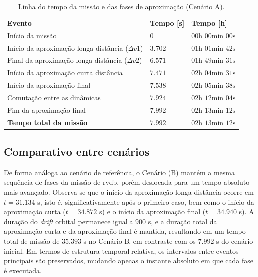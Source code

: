 \begin{table}[H]
\centering
\caption{Linha do tempo da missão e das fases de aproximação (Cenário A).}
\label{tab:cap4_linha_tempo}
\begin{tabularx}{\linewidth}{|
  >{\raggedright\arraybackslash}X|
  >{\centering\arraybackslash}X|
  >{\centering\arraybackslash}X|}
\hline
\textbf{Evento} &
\textbf{Tempo [s]} &
\textbf{Tempo [h]} \\
\hhline{|=|=|=|}
Início da missão &
$0$ & $00\text{h }00\text{min }00\text{s}$ \\
\hline
Início da aproximação longa distância ($\Delta v1$) & $3.702$ & $01\text{h }01\text{min }42\text{s}$ \\
\hline
Final da aproximação longa distância ($\Delta v2$) & $6.571$ & $01\text{h }49\text{min }31\text{s}$ \\
\hline
Início da aproximação curta distância &$7.471$ & $02\text{h }04\text{min }31\text{s}$ \\
\hline
Início da aproximação final & $7.538$ & $02\text{h }05\text{min }38\text{s}$ \\
\hline
Comutação entre as dinâmicas & $7.924$ & $02\text{h }12\text{min }04\text{s}$ \\
\hline
Fim da aproximação final & $7.992$ & $02\text{h }13\text{min }12\text{s}$ \\
\hline
\textbf{Tempo total da missão} & $7.992$ & $02\text{h }13\text{min }12\text{s}$ \\
\hline
\end{tabularx}
\end{table}

\subsection{Comparativo entre cenários}

De forma análoga ao cenário de referência, o Cenário (B) mantém a mesma sequência de fases da missão de \gls{rvdb}, porém deslocada para um tempo absoluto mais avançado.
Observa-se que o início da aproximação longa distância ocorre em $t = 31.134$ s, isto é, significativamente após o primeiro caso, bem como o início da aproximação curta ($t = 34.872$ s) e o início da aproximação final ($t = 34.940$ s). A duração do \emph{drift} orbital permanece igual a $900$ s, e a duração total da aproximação curta e da aproximação final é mantida, resultando em um tempo total de missão de $35.393$ s no Cenário B, em contraste com os $7.992$ s do cenário inicial. Em termos de estrutura temporal relativa, os intervalos entre eventos principais são preservados, mudando apenas o instante absoluto em que cada fase é executada.

